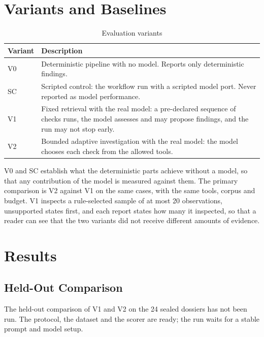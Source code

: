 \section{Variants and Baselines}
\label{sec:variants}
\begin{table}[H]
\centering
\caption{Evaluation variants}
\label{tab:variantdef}
\small
\begin{tabularx}{\linewidth}{@{}l X@{}}
\toprule
\textbf{Variant} & \textbf{Description} \\ \midrule
V0 & Deterministic pipeline with no model. Reports only deterministic findings. \\
SC & Scripted control: the workflow run with a scripted model port. Never reported as model performance. \\
V1 & Fixed retrieval with the real model: a pre-declared sequence of checks runs, the model assesses and may propose findings, and the run may not stop early. \\
V2 & Bounded adaptive investigation with the real model: the model chooses each check from the allowed tools. \\
\bottomrule
\end{tabularx}
\end{table}

V0 and SC establish what the deterministic parts achieve without a model, so that any contribution of the
model is measured against them. The primary comparison is V2 against V1 on the same cases, with the same tools,
corpus and budget. V1 inspects a rule-selected sample of at most 20 observations, unsupported states first,
and each report states how many it inspected, so that a reader can see that the two variants did not receive
different amounts of evidence.

\section{Results}
\label{sec:results}

\subsection{Held-Out Comparison}
The held-out comparison of V1 and V2 on the 24 sealed dossiers has not been run. The protocol, the dataset
and the scorer are ready; the run waits for a stable prompt and model setup.


